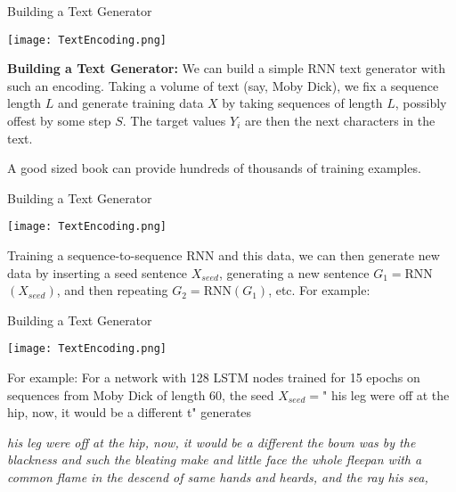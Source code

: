 \documentclass[10pt, table, dvipsnames,xcdraw, handout]{beamer}
\begin{document}
\begin{frame}[fragile]{Building a Text Generator}
  \begin{minipage}[t][0.4\textheight][t]{\textwidth}
	\centering \texttt{[image: TextEncoding.png]} 
  \end{minipage}
  \vfill
\begin{minipage}[t][0.6\textheight][t]{\textwidth}
\textbf{Building a Text Generator:} 
We can build a simple RNN text generator with such an encoding. Taking a volume of text (say, Moby Dick), we fix a sequence length $L$ and generate training data $X$ by taking sequences of length $L$, possibly offest by some step $S$. The target values $Y_i$ are then the next characters in the text. 

A good sized book can provide hundreds of thousands of training examples.  
\end{minipage}
\end{frame}




\begin{frame}[fragile]{Building a Text Generator}
  \begin{minipage}[t][0.4\textheight][t]{\textwidth}
	\centering \texttt{[image: TextEncoding.png]} 
  \end{minipage}
  \vfill
\begin{minipage}[t][0.6\textheight][t]{\textwidth}
Training a sequence-to-sequence RNN and this data, we can then generate new data by inserting a seed sentence $X_{seed}$, generating a new sentence $G_1 = $RNN$(X_{seed})$, and then repeating $G_2 = $RNN$(G_1)$, etc. For example:


\end{minipage}
\end{frame}


\begin{frame}[fragile]{Building a Text Generator}
  \begin{minipage}[t][0.4\textheight][t]{\textwidth}
	\centering \texttt{[image: TextEncoding.png]} 
  \end{minipage}
  \vfill
\begin{minipage}[t][0.6\textheight][t]{\textwidth}
For example: For a network with 128 LSTM nodes trained for 15 epochs on sequences from Moby Dick of length  60, the seed $X_{seed} = $" his leg were off at the hip, now, it would be a different t" generates\newline

\emph{ his leg were off at the hip, now, it would be a different the bown was by the blackness and such the bleating make and little face the whole fleepan with a common flame in the descend of same hands and heards, and the ray his sea,}
\end{minipage}
\end{frame}
\end{document}
